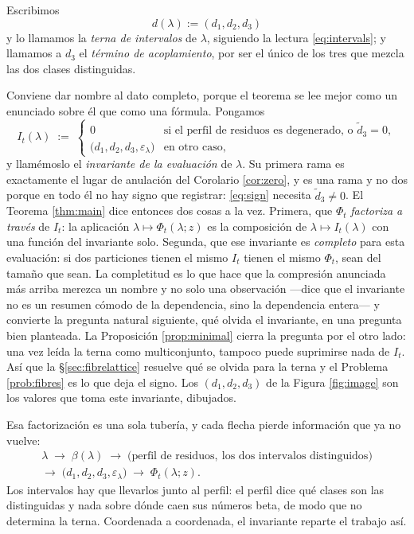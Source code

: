 \documentclass[11pt,reqno]{amsart}
\theoremstyle{plain}
\theoremstyle{definition}
\begin{document}
Escribimos
\[
d(\lambda):=(d_1,d_2,d_3)
\]
y lo llamamos la \emph{terna de intervalos} de $\lambda$, siguiendo la lectura
\eqref{eq:intervals}; y llamamos a $d_3$ el \emph{término de acoplamiento}, por ser el único de los
tres que mezcla las dos clases distinguidas.

Conviene dar nombre al dato completo, porque el teorema se lee mejor como un enunciado sobre él que
como una fórmula. Pongamos
\begin{equation}\label{eq:invariant}
\boxed{\;\;I_t(\lambda)\;:=\;\begin{cases}
0 & \text{si el perfil de residuos es degenerado, o }\tilde d_3=0,\\[2pt]
\bigl(d_1,d_2,d_3,\varepsilon_\lambda\bigr) & \text{en otro caso},
\end{cases}\;\;}
\end{equation}
y llamémoslo el \emph{invariante de la evaluación} de $\lambda$. Su primera rama es exactamente el
lugar de anulación del Corolario \ref{cor:zero}, y es una rama y no dos porque en todo él no hay
signo que registrar: \eqref{eq:sign} necesita $\tilde d_3\ne0$. El Teorema \ref{thm:main} dice
entonces dos cosas a la vez. Primera, que $\Phi_t$ \emph{factoriza a través} de $I_t$: la aplicación
$\lambda\mapsto\Phi_t(\lambda;z)$ es la composición de $\lambda\mapsto I_t(\lambda)$ con una función
del invariante solo. Segunda, que ese invariante es \emph{completo} para esta evaluación: si dos
particiones tienen el mismo $I_t$ tienen el mismo $\Phi_t$, sean del tamaño que sean. La completitud
es lo que hace que la compresión anunciada más arriba merezca un nombre y no solo una observación
---dice que el invariante no es un resumen cómodo de la dependencia, sino la dependencia entera--- y
convierte la pregunta natural siguiente, qué olvida el invariante, en una pregunta bien planteada.
La Proposición \ref{prop:minimal} cierra la pregunta por el otro lado: una vez leída la terna como
multiconjunto, tampoco puede suprimirse nada de $I_t$. Así que la \S\ref{sec:fibrelattice} resuelve
qué se olvida para la terna y el Problema \ref{prob:fibres} es lo que deja
el signo. Los $(d_1,d_2,d_3)$ de la Figura \ref{fig:image} son
los valores que toma este invariante, dibujados.

Esa factorización es una sola tubería, y cada flecha pierde información que ya no vuelve:
\begin{multline*}
\lambda\;\longrightarrow\;\beta(\lambda)\;\longrightarrow\;
\bigl(\text{perfil de residuos},\ \text{los dos intervalos distinguidos}\bigr)\\
\longrightarrow\;\bigl(d_1,d_2,d_3,\varepsilon_\lambda\bigr)\;\longrightarrow\;\Phi_t(\lambda;z).
\end{multline*}
Los intervalos hay que llevarlos junto al perfil: el perfil dice qué clases son las distinguidas y
nada sobre dónde caen sus números beta, de modo que no determina la terna.
Coordenada a coordenada, el invariante reparte el trabajo así.
\end{document}
